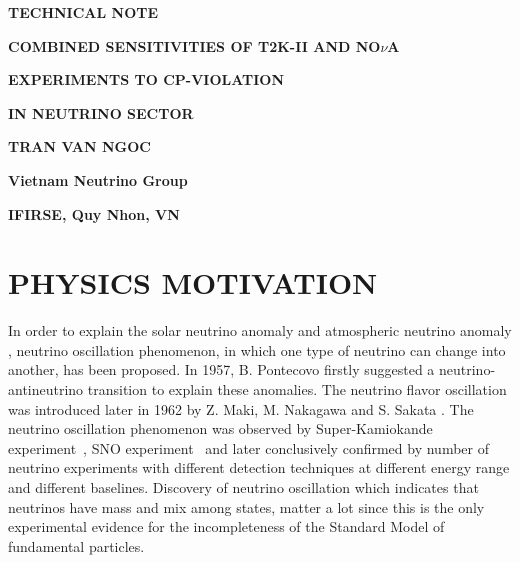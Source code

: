 \documentclass[a4 paper,12pt]{report}%
\let\up\MakeUppercase %
\def\Mr{\uppercase}
\begin{document}
\title {}
\author{}
\pagestyle{plain}
\renewcommand\bibname{\centerline{\Large\up REFERENCES}}
\renewcommand\chaptername{\Large\up Chapter}
\renewcommand\contentsname{{\centerline{\Large\up TABLE OF CONTENT}}}
\makeatletter


\newpage 
\centerline{\LARGE {\up{\bf{technical note}}}}
\vspace{2cm}
\centerline{\Large {\up{\bf{combined sensitivities of T2K-II and NO$\nu$A}}}}
\centerline{\Large {\up{\bf{experiments to CP-violation}}}}
\centerline{\Large {\up{\bf{ in neutrino sector}}}}
\vspace{4cm}
\centerline{\LARGE {\up{\bf{tran van ngoc}}}}
\vspace{2cm}
\centerline{\LARGE {{\bf{Vietnam Neutrino Group}}}}
\centerline{\LARGE {{\bf{IFIRSE, Quy Nhon, VN}}}}
\tableofcontents

\newpage
\section{\Mr{Physics Motivation}}
\hspace{1cm}
In order to explain the solar neutrino anomaly \cite{Cleveland:1998nv} and atmospheric neutrino anomaly \cite{Hirata:1988uy}, neutrino oscillation phenomenon, in which one type of neutrino can change into another, has been proposed. In 1957, B. Pontecovo \cite{Pontecorvo:1957cp} firstly suggested a neutrino-antineutrino transition to explain these anomalies. The neutrino flavor oscillation was introduced later in 1962 by Z. Maki, M. Nakagawa and S. Sakata \cite{Maki:1962mu}. The neutrino oscillation phenomenon was observed  by Super-Kamiokande experiment~\cite{Fukuda:1998mi}, SNO experiment~\cite{Ahmad:2001an} and later conclusively confirmed by number of neutrino experiments with different detection techniques at different energy range and different baselines. Discovery of neutrino oscillation which indicates that neutrinos have mass and mix among states, matter a lot since this is the only experimental evidence for the incompleteness of the Standard Model of fundamental particles. 
\end{document}

